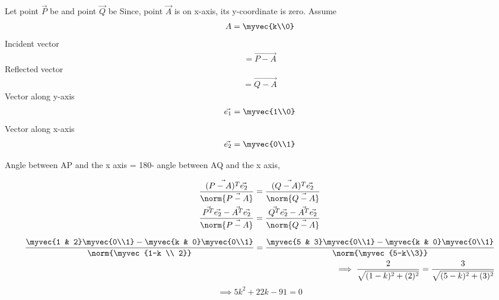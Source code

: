 Let point $\vec{P}$ be  and point $\vec{Q}$ be 
Since, point $\vec{A}$ is on x-axis, its y-coordinate is zero.
Assume \begin{align}
    A=\myvec{k\\0}
\end{align}
Incident vector
 \begin{align}
     = \vec{P-A}
\end{align}
Reflected vector 
\begin{align}
    = \vec{Q-A}
\end{align}
Vector along y-axis
\begin{align}
\vec{e_1} =\myvec{1\\0}\\
\end{align}
Vector along x-axis
\begin{align}
 \vec{e_2} =\myvec{0\\1}
\end{align}

Angle between AP and the x axis = 180\degree - angle between AQ and the x axis,

\begin{align}
\dfrac{\vec{(P-A)^T} \Vec{e_2}}{\norm{\Vec{P-A}}}=\dfrac{\vec{(Q-A)^T} \Vec{e_2}}{\norm{\Vec{Q-A}}}
\\
\dfrac{\vec{P^T}\Vec{e_2}-\Vec{A^T}\Vec{e_2}}{ \norm{\Vec{P-A}}}=\dfrac{\vec{Q^T}\Vec{e_2}-\Vec{A^T}\Vec{e_2}}{\norm{\Vec{Q-A}}}
\end{align}

\begin{align}
 \dfrac{\myvec{1 & 2}\myvec{0\\1}-\myvec{k & 0}\myvec{0\\1}}{\norm{\myvec{1-k \\ 2}}}=\dfrac{\myvec{5 & 3}\myvec{0\\1}-\myvec{k & 0}\myvec{0\\1}}{\norm{\myvec{5-k\\3}}}
 \\
 \implies \dfrac{2}{\sqrt{(1-k)^2+(2)^2}}=\dfrac{3}{\sqrt{(5-k)^2+(3)^2}}
\end{align}
\begin{equation}
    \label{eq:solutions/line_plane/591}
       \implies 5k^2+22k-91=0 
\end{equation}

